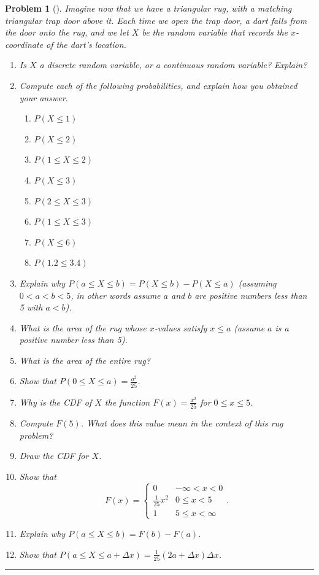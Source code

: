 \documentclass[letterpaper,oneside]{book}%
\theoremstyle{plain}
\theoremstyle{box}
\theoremstyle{problem}
\newtheorem{problemnum}{Problem}[chapter]
\newenvironment{problem}[1][]{\begin{problemnum}[#1]}{\end{problemnum}\nopagebreak\hrule\bigskip}
\begin{document}
\begin{problem}
 Imagine now that we have a triangular rug, with a matching triangular trap door above it. Each time we open the trap door, a dart falls from the door onto the rug, and we let $X$ be the random variable that records the $x$-coordinate of the dart's location. 
 \begin{center}
 \end{center}
 
 \begin{enumerate}

  \item Is $X$ a discrete random variable, or a continuous random variable? Explain?
  \item Compute each of the following probabilities, and explain how you obtained your answer.
   \begin{enumerate}
    \item $P(X\leq 1)$
    \item $P(X\leq 2)$
    \item $P(1\leq X\leq 2)$
    \item $P(X\leq 3)$
    \item $P(2\leq X\leq 3)$
    \item $P(1\leq X\leq 3)$
    \item $P(X \leq 6)$
    \item $P(1.2 \leq 3.4)$
   \end{enumerate}
  \item Explain why $P(a\leq X\leq b) = P(X\leq b)-P(X\leq a)$ (assuming $0 < a < b < 5$, in other words assume $a$ and $b$ are positive numbers less than 5 with $a<b$). 
  \item What is the area of the rug whose $x$-values satisfy $x\leq a$ (assume $a$ is a positive number less than 5).  
  \item What is the area of the entire rug?
  \item Show that $P(0\leq X\leq a) = \frac{a^2}{25}$. 
  \item Why is the CDF of $X$ the function $F(x) = \frac{x^2}{25}$ for $0\leq x\leq 5$. 
  \item Compute $F(5)$.  What does this value mean in the context of this rug problem?
  \item Draw the CDF for $X$.
  \item Show that $$F(x) =\begin{cases}0 &-\infty<x<0\\\frac{1}{25}x^2 & 0\leq x<5 \\ 1 &5\leq x<\infty\end{cases}.$$
  \item Explain why $P(a\leq X\leq b) = F(b)-F(a)$. 
    \item Show that $P(a \leq X \leq a +\Delta x) = \frac{1}{25} (2a + \Delta x) \Delta x$. 
  

\end{enumerate}
\end{problem}
\end{document}
